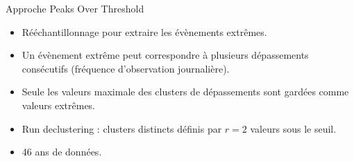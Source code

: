 \documentclass[aspectratio=169]{beamer}
\begin{document}


\begin{frame}{Approche Peaks Over Threshold}
\begin{itemize}
	\setlength{\itemsep}{17pt}
	\item Rééchantillonnage pour extraire les évènements extrêmes.
	\item Un évènement extrême peut correspondre à plusieurs dépassements consécutifs (fréquence d'observation journalière).
	\item Seule les valeurs maximale des clusters de dépassements sont gardées comme valeurs extrêmes.
	\item Run declustering : clusters distincts définis par $r=2$ valeurs sous le seuil.
	\item 46 ans de données.
\end{itemize}
\end{frame}
\end{document}
